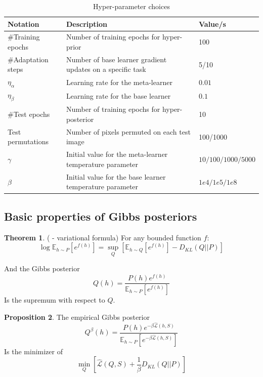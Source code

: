 \documentclass{article}
\theoremstyle{definition}
\newtheorem{theorem}{Theorem}[section]
\newtheorem{proposition}[theorem]{Proposition}
\newcommand{\Expect}[2]{\mathbb{E}_{#1}\left [#2 \right ]}
\begin{document}
\begin{table}[h]	
	
	\centering
	\begin{tabular}{lll}
		\toprule
		Notation   & Description  & Value/s   \\
		\midrule
		\#Training epochs & Number of training epochs for hyper-prior   & 100      \\
		\midrule
		\#Adaptation steps & Number of base learner gradient updates on a specific task   & 5/10      \\
		\midrule
		$\eta_{\alpha}$  & Learning rate for the meta-learner   & $0.01$      \\
		\midrule
		$\eta_{\beta}$  & Learning rate for the base learner   & $0.1$      \\
		\midrule
		\#Test epochs  & Number of training epochs for hyper-posterior   & 10      \\
		\midrule
		Test permutations  & Number of pixels permuted on each test image   & 100/1000      \\
		\midrule
		$\gamma$  & Initial value for the meta-learner temperature parameter   & $10/100/1000/5000$      \\
		\midrule
		$\beta$  & Initial value for the base learner temperature parameter   & $1e4/1e5/1e8$      \\
		\bottomrule
	\end{tabular}
	\caption{Hyper-parameter choices}
	\label{table:hyper-params}
\end{table}


\subsection{Basic properties of Gibbs posteriors} \label{append:gibbs-properties}

\begin{theorem} (\citet{Donsker1975} - variational formula)
	For any bounded function $f$:
	\begin{equation*} 
	\log \Expect{h\sim P}{e^{f(h)}}=\sup_{Q}\left[\Expect{h\sim Q}{e^{f(h)}}-D_{KL}(Q||P) \right ]
	\end{equation*}
	
	And the Gibbs posterior 
	$$Q(h)=\frac{P(h)e^{f(h)}}{\Expect{h\sim P}{e^{f(h)}}}$$ 
	Is the supremum with respect to $Q$.
\end{theorem}

\begin{proposition}
	The empirical Gibbs posterior 
	$$Q^\beta(h)=\frac{P(h)e^{-\beta \hat{\mathcal{L}}(h, S)}}{\Expect{h\sim P}{e^{-\beta \hat{\mathcal{L}}(h, S)}}}$$ 
	Is the minimizer of $$\min_{Q}\left[\hat{\mathcal{L}}(Q, S)+\frac{1}{\beta}D_{KL}(Q||P)\right ]$$
\end{proposition}
\end{document}
